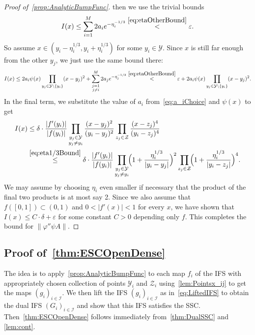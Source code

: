 \documentclass[11pt,]{article}
\def\cref#1{\ref{#1}}%
\theoremstyle{definition}
\theoremstyle{remark}
\newcommand{\0}{\mathbf{0}}
\begin{document}
\begin{proof}[Proof of~\cref{prop:AnalyticBumpFunc}]
then we use the trivial bounds
\begin{equation*}
	I(x) \leq \sum_{i=1}^{M} 2a_ie^{-\eta_i^{-1/3}} \stackrel{\eqref{eq:etaOtherBound}}{<} \varepsilon.
\end{equation*}
So assume $x\in(y_i-\eta_i^{1/3}, y_i+\eta_i^{1/3})$ for some $y_i\in\mathcal{Y}$. Since $x$ is
still far enough from the other $y_j$, we just use the same bound there:
\begin{equation*}
	I(x) \leq 2a_i \psi(x) \prod_{y_j\in\mathcal{Y}\setminus\{y_i\}} (x-y_j)^2 +
	\sum_{\substack{j=1 \\ j\neq i}}^{M} 2a_j e^{-\eta_j^{-1/3}}
	\stackrel{\eqref{eq:etaOtherBound}}{<} \varepsilon + 2a_i \psi(x)
	\prod_{y_j\in\mathcal{Y}\setminus\{y_i\}} (x-y_j)^2.
\end{equation*}
In the final term, we substitute the value of $a_i$ from~\cref{eq:a_iChoice} and $\psi(x)$ to get
\begin{align*}
	I(x)&\leq \delta \cdot \frac{|f'(y_i)|}{|f(y_i)|} \prod_{\substack{y_j\in\mathcal{Y} \\
	y_j\neq y_i}} \frac{(x-y_j)^2}{(y_i - y_j)^2}  \prod_{z_j\in\mathcal{Z}}
	\frac{(x-z_j)^4}{(y_i - z_j)^4} \\
	&\stackrel{\eqref{eq:eta1/3Bound}}{\leq}  \delta \cdot
	\frac{|f'(y_i)|}{|f(y_i)|}\prod_{\substack{y_j\in\mathcal{Y} \\ y_j\neq y_i}}\!\! \Big(
	1+\frac{\eta_i^{1/3}}{|y_i-y_j|} \Big)^2 \prod_{z_j\in\mathcal{Z}}\!\! \Big(
      1+\frac{\eta_i^{1/3}}{|y_i-z_j|} \Big)^4. 
\end{align*}
We may assume by choosing $\eta_i$ even smaller if necessary that the product of the final two
products is at most say 2. Since we also assume that $f([0,1])\subset (0,1)$ and $0<|f'(x)|<1$ for
every $x$, we have shown that $I(x)\leq C\cdot\delta+\varepsilon$ for some constant $C>0$ depending
only $f$. This completes the bound for $\| \varphi'' \psi A\|$. 
\end{proof}

\subsection{Proof of~\cref{thm:ESCOpenDense}}

The idea is to apply~\cref{prop:AnalyticBumpFunc} to each map $f_i$
of the IFS with appropriately chosen collection of points $\mathcal{Y}_i$ and $\mathcal{Z}_i$
using~\cref{lem:Pointsx_ij} to get the maps $(g_i)_{i\in\mathcal{I}}$. We then lift the IFS
$(g_i)_{i\in\mathcal{I}}$ as in~\cref{eq:LiftedIFS} to obtain the dual IFS $(G_i)_{i\in\mathcal{I}}$ and show that this
IFS satisfies the SSC. Then~\cref{thm:ESCOpenDense} follows immediately from~\cref{thm:DualSSC} and \cref{lem:cont}.
\end{document}
